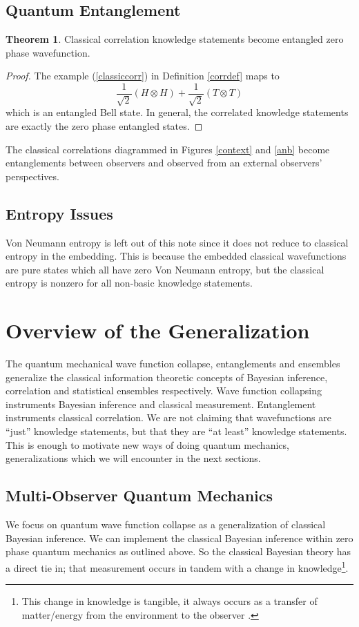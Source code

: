 \documentclass[12pt,a4paper]{article}
\theoremstyle{myrule}
\theoremstyle{postulate}
\theoremstyle{definition}
\newtheorem{theorem}{Theorem}[section]
\begin{document}
\subsection{Quantum Entanglement}
\label{entangle}
\begin{theorem}
  Classical correlation knowledge statements become entangled zero phase wavefunction.
\end{theorem}
\begin{proof}
  The example (\ref{classiccorr}) in Definition \ref{corrdef} maps to
 \begin{equation}
  \label{bell}
  \frac{1}{\sqrt{2}} (H \otimes H) + \frac{1}{\sqrt{2}} (T \otimes T)
\end{equation}
which is an entangled Bell state.  In general, the correlated knowledge statements are exactly the zero phase entangled states.
\end{proof}

The classical correlations diagrammed in Figures \ref{context} and \ref{anb} become entanglements between observers and observed from an external observers' perspectives.

\subsection{Entropy Issues}
Von Neumann entropy is left out of this note since it does not reduce to classical entropy in the embedding.  This is because the embedded classical wavefunctions are pure states which all have zero Von Neumann entropy, but the classical entropy is nonzero for all non-basic knowledge statements.

\section{Overview of the Generalization}

The quantum mechanical wave function collapse, entanglements and ensembles generalize the classical information theoretic concepts of Bayesian inference, correlation and statistical ensembles respectively.  Wave function collapsing instruments Bayesian inference and classical measurement.  Entanglement instruments classical correlation.  We are not claiming that wavefunctions are ``just'' knowledge statements, but that they are ``at least'' knowledge statements.  This is enough to motivate new ways of doing quantum mechanics, generalizations which we will encounter in the next sections.

\subsection{Multi-Observer Quantum Mechanics}
We focus on quantum wave function collapse as a generalization of classical Bayesian inference.  We can implement the classical Bayesian inference within zero phase quantum mechanics as outlined above.  So the classical Bayesian theory has a direct tie in; that measurement occurs in tandem with a change in knowledge\footnote{This change in knowledge is tangible, it always occurs as a transfer of matter/energy from the environment to the observer \cite{thrust}.}.  
\end{document}
